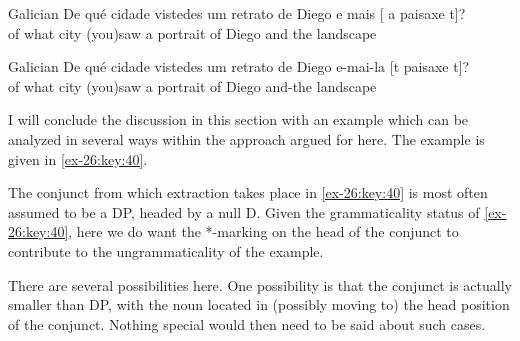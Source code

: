 \documentclass[output=paper]{langsci/langscibook}
\begin{document}
\ea\label{ex-26:key:38}Galician
    \gll \llap{*}De qué cidade vistedes um retrato de Diego e mais [ a  paisaxe t]?\\
    of what city (you)saw a portrait of Diego and {} {} the landscape\\
\z

\ea\label{ex-26:key:39}Galician
    \gll {}De qué cidade vistedes um retrato de Diego e-mai-la [t paisaxe t]?\\
    of what city (you)saw a portrait of Diego and-the {}  landscape\\
\z

I will conclude the discussion in this section with an example which can be
analyzed in several ways within the approach argued for here. The example is
given in \eqref{ex-26:key:40}.

\label{ex-26:key:40}
\z

The conjunct from which extraction takes place in \eqref{ex-26:key:40} is most often assumed to
be a DP, headed by a null D. Given the grammaticality status of \eqref{ex-26:key:40}, here we
do want the *-marking on the head of the conjunct to contribute to the
ungrammaticality of the example.

There are several possibilities here. One possibility is that the conjunct is
actually smaller than DP, with the noun located in (possibly moving to) the
head position of the conjunct. Nothing special would then need to be said about
such cases.
\end{document}

